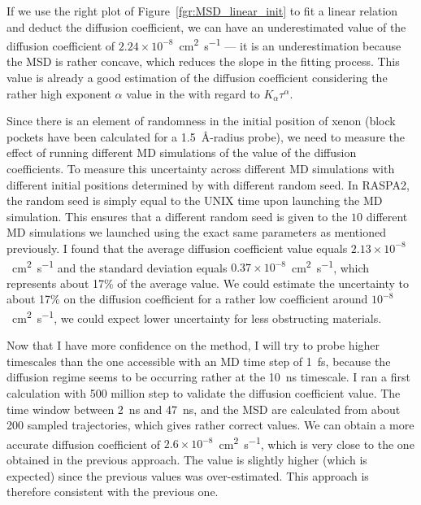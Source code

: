 \documentclass[main]{subfiles}
\begin{document}
If we use the right plot of Figure~\ref{fgr:MSD_linear_init} to fit a linear relation and deduct the diffusion coefficient, we can have an underestimated value of the diffusion coefficient of $2.24\times 10^{-8}$~\si{\square\cm\per\s} --- it is an underestimation because the MSD is rather concave, which reduces the slope in the fitting process. This value is already a good estimation of the diffusion coefficient considering the rather high exponent $\alpha$ value in the with regard to $K_\alpha\tau^\alpha$.

Since there is an element of randomness in the initial position of xenon (block pockets have been calculated for a \SI{1.5}{\angstrom}-radius probe), we need to measure the effect of running different MD simulations of the value of the diffusion coefficients. To measure this uncertainty across different MD simulations with different initial positions determined by with different random seed. In RASPA2, the random seed is simply equal to the UNIX time upon launching the MD simulation. This ensures that a different random seed is given to the $10$ different MD simulations we launched using the exact same parameters as mentioned previously. I found that the average diffusion coefficient value equals $2.13\times 10^{-8}$~\si{\square\cm\per\s} and the standard deviation equals $0.37\times 10^{-8}$~\si{\square\cm\per\s}, which represents about {17\%} of the average value. We could estimate the uncertainty to about {17\%} on the diffusion coefficient for a rather low coefficient around $10^{-8}$~\si{\square\cm\per\s}, we could expect lower uncertainty for less obstructing materials. 

Now that I have more confidence on the method, I will try to probe higher timescales than the one accessible with an MD time step of \SI{1}{\fs}, because the diffusion regime seems to be occurring rather at the \SI{10}{\ns} timescale. I ran a first calculation with 500 million step to validate the diffusion coefficient value. The time window between \SI{2}{\ns} and \SI{47}{\ns}, and the MSD are calculated from about 200 sampled trajectories, which gives rather correct values. We can obtain a more accurate diffusion coefficient of $2.6\times 10^{-8}$~\si{\square\cm\per\s}, which is very close to the one obtained in the previous approach. The value is slightly higher (which is expected) since the previous values was over-estimated. This approach is therefore consistent with the previous one.
\end{document}

